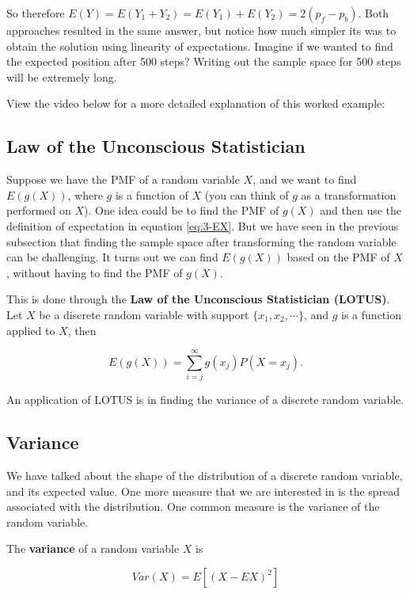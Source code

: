 \documentclass[
]{book}
\begin{document}
So therefore \(E(Y) = E(Y_1 + Y_2) = E(Y_1) + E(Y_2) = 2(p_f - p_b)\). Both approaches resulted in the same answer, but notice how much simpler its was to obtain the solution using linearity of expectations. Imagine if we wanted to find the expected position after 500 steps? Writing out the sample space for 500 steps will be extremely long.

View the video below for a more detailed explanation of this worked example:

\subsection{Law of the Unconscious Statistician}\label{law-of-the-unconscious-statistician}

Suppose we have the PMF of a random variable \(X\), and we want to find \(E(g(X))\), where \(g\) is a function of \(X\) (you can think of \(g\) as a transformation performed on \(X\)). One idea could be to find the PMF of \(g(X)\) and then use the definition of expectation in equation \eqref{eq:3-EX}. But we have seen in the previous subsection that finding the sample space after transforming the random variable can be challenging. It turns out we can find \(E(g(X))\) based on the PMF of \(X\), without having to find the PMF of \(g(X)\).

This is done through the \textbf{Law of the Unconscious Statistician (LOTUS)}. Let \(X\) be a discrete random variable with support \(\{x_1, x_2, \cdots \}\), and \(g\) is a function applied to \(X\), then

\begin{equation} 
E(g(X)) = \sum_{i=j}^{\infty} g(x_j) P(X=x_j).
\label{eq:3-lotus}
\end{equation}

An application of LOTUS is in finding the variance of a discrete random variable.

\subsection{Variance}\label{variance}

We have talked about the shape of the distribution of a discrete random variable, and its expected value. One more measure that we are interested in is the spread associated with the distribution. One common measure is the variance of the random variable.

The \textbf{variance} of a random variable \(X\) is

\begin{equation} 
Var(X) = E[(X - EX)^2]
\label{eq:3-var2}
\end{equation}
\end{document}
